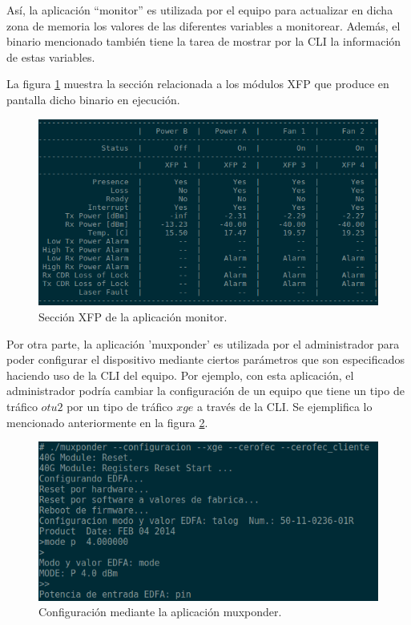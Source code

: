 Así, la aplicación “monitor” es utilizada por el equipo para actualizar en dicha zona de memoria los valores de las diferentes variables a monitorear. Además, el binario mencionado también tiene la tarea de mostrar por la CLI la información de estas variables. 

La figura \ref{fig:monitor} muestra la sección relacionada a los módulos XFP que produce en pantalla dicho binario en ejecución.

\begin{figure}[H]
    \centering
    \includegraphics[scale=0.75]{Figures/monitorapp.png}
    \caption{Sección XFP de la aplicación monitor.}
    \label{fig:monitor}
  \end{figure}

  Por otra parte, la aplicación 'muxponder' es utilizada por el administrador para poder configurar el dispositivo mediante ciertos parámetros que son especificados haciendo uso de la CLI del equipo. Por ejemplo, con esta aplicación, el administrador podría cambiar la configuración de un equipo que tiene un tipo de tráfico $otu2$ por un tipo de tráfico $xge$ a través de la CLI. Se ejemplifica lo mencionado anteriormente en la figura \ref{fig:mxpapp}.

  \begin{figure}[H]
    \centering
    \includegraphics[scale=0.6]{Figures/muxponderapp.png}
    \caption{Configuración mediante la aplicación muxponder.}
    \label{fig:mxpapp}
  \end{figure}

